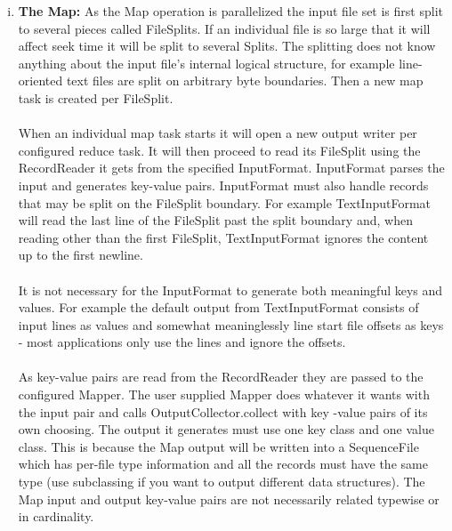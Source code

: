 \documentclass[a4paper,12pt,oneside]{report}
\begin{document}
\begin{enumerate}[(i)]
        \item \textbf{The Map:}
                As the Map operation is parallelized the input file set is first split to several pieces 
                called FileSplits. If an individual file is so large that it will affect seek time it will be split 
                to several Splits. The splitting does not know anything about the input file's internal logical structure, 
                for example line-oriented text files are split on arbitrary byte boundaries. Then a new map task is created per FileSplit.\\ 
                \\
                When an individual map task starts it will open a new output writer per configured reduce task. It will 
                then proceed to read its FileSplit using the RecordReader it gets from the specified InputFormat. InputFormat 
                parses the input and generates key-value pairs. InputFormat must also handle records that may be split on the FileSplit boundary. For example TextInputFormat will read the last line of the FileSplit past the split boundary and, when reading other than the first FileSplit, TextInputFormat ignores the content up to the first newline.\\ 
                \\
                It is not necessary for the InputFormat to generate both meaningful keys and values. For example the 
                default output from TextInputFormat consists of input lines as values and somewhat meaninglessly line 
                start file offsets as keys - most applications only use the lines and ignore the offsets.\\
                \\
                As key-value pairs are read from the RecordReader they are passed to the configured Mapper. The user 
                supplied Mapper does whatever it wants with the input pair and calls OutputCollector.collect with key
                -value pairs of its own choosing. The output it generates must use one key class and one value class. 
                This is because the Map output will be written into a SequenceFile which has per-file type information 
                and all the records must have the same type (use subclassing if you want to output different data structures). 
                The Map input and output key-value pairs are not necessarily related typewise or in cardinality.\\ 

\end{enumerate}
\end{document}
